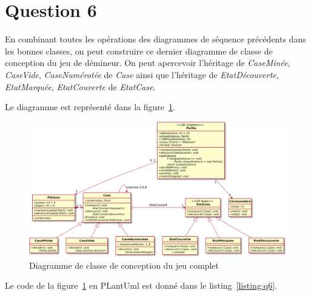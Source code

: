 \documentclass[a4paper,12pt]{article}
\begin{document}
\section{Question 6}\label{question-6}

En combinant toutes les opérations des diagrammes de séquence précédents dans les bonnes classes, on peut construire ce dernier diagramme de classe de conception du jeu de démineur. On peut apercevoir l'héritage de \emph{CaseMinée}, \emph{CaseVide}, \emph{CaseNumérotée} de \emph{Case} ainsi que l'héritage de \emph{EtatDécouverte}, \emph{EtatMarquée}, \emph{EtatCouverte} de \emph{EtatCase}.

Le diagramme est représenté dans la figure~\ref{fig:q6}.

\begin{figure}[htpb]
    \centering
    \includegraphics[width=0.74\textheight,angle=-90]{./images/q6-modif.png}
    \caption{Diagramme de classe de conception du jeu complet}
    \label{fig:q6}
\end{figure}

\clearpage

Le code de la figure~\ref{fig:q6} en PLantUml est donné dans le listing~\ref{listing:q6}.

\inputminted[bgcolor=lightgray!40,linenos=true]{fsharp}{./code-images/q6}
\end{document}

